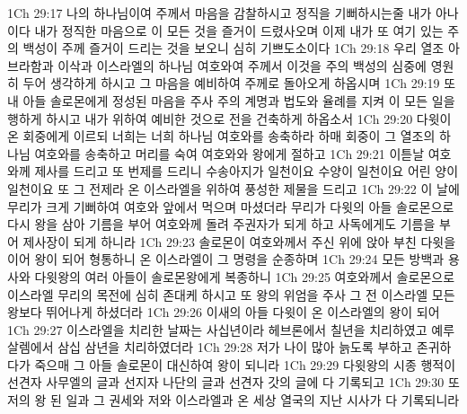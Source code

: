 1Ch 29:17  나의 하나님이여 주께서 마음을 감찰하시고 정직을 기뻐하시는줄 내가 아나이다 내가 정직한 마음으로 이 모든 것을 즐거이 드렸사오며 이제 내가 또 여기 있는 주의 백성이 주께 즐거이 드리는 것을 보오니 심히 기쁘도소이다
1Ch 29:18  우리 열조 아브라함과 이삭과 이스라엘의 하나님 여호와여 주께서 이것을 주의 백성의 심중에 영원히 두어 생각하게 하시고 그 마음을 예비하여 주께로 돌아오게 하옵시며
1Ch 29:19  또 내 아들 솔로몬에게 정성된 마음을 주사 주의 계명과 법도와 율례를 지켜 이 모든 일을 행하게 하시고 내가 위하여 예비한 것으로 전을 건축하게 하옵소서
1Ch 29:20  다윗이 온 회중에게 이르되 너희는 너희 하나님 여호와를 송축하라 하매 회중이 그 열조의 하나님 여호와를 송축하고 머리를 숙여 여호와와 왕에게 절하고
1Ch 29:21  이튿날 여호와께 제사를 드리고 또 번제를 드리니 수송아지가 일천이요 수양이 일천이요 어린 양이 일천이요 또 그 전제라 온 이스라엘을 위하여 풍성한 제물을 드리고
1Ch 29:22  이 날에 무리가 크게 기뻐하여 여호와 앞에서 먹으며 마셨더라 무리가 다윗의 아들 솔로몬으로 다시 왕을 삼아 기름을 부어 여호와께 돌려 주권자가 되게 하고 사독에게도 기름을 부어 제사장이 되게 하니라
1Ch 29:23  솔로몬이 여호와께서 주신 위에 앉아 부친 다윗을 이어 왕이 되어 형통하니 온 이스라엘이 그 명령을 순종하며
1Ch 29:24  모든 방백과 용사와 다윗왕의 여러 아들이 솔로몬왕에게 복종하니
1Ch 29:25  여호와께서 솔로몬으로 이스라엘 무리의 목전에 심히 존대케 하시고 또 왕의 위엄을 주사 그 전 이스라엘 모든 왕보다 뛰어나게 하셨더라
1Ch 29:26  이새의 아들 다윗이 온 이스라엘의 왕이 되어
1Ch 29:27  이스라엘을 치리한 날짜는 사십년이라 헤브론에서 칠년을 치리하였고 예루살렘에서 삼십 삼년을 치리하였더라
1Ch 29:28  저가 나이 많아 늙도록 부하고 존귀하다가 죽으매 그 아들 솔로몬이 대신하여 왕이 되니라
1Ch 29:29  다윗왕의 시종 행적이 선견자 사무엘의 글과 선지자 나단의 글과 선견자 갓의 글에 다 기록되고
1Ch 29:30  또 저의 왕 된 일과 그 권세와 저와 이스라엘과 온 세상 열국의 지난 시사가 다 기록되니라


